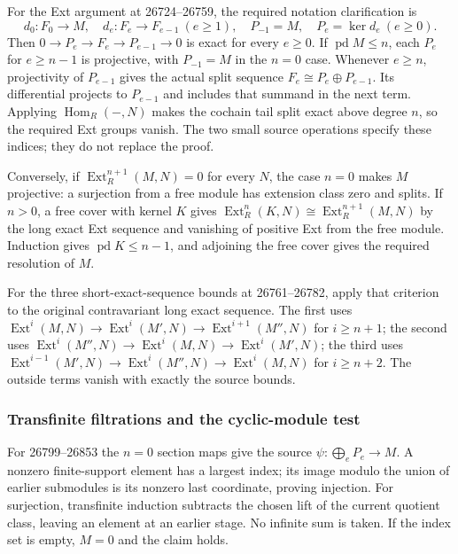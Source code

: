 For the Ext argument at 26724--26759, the required notation clarification is \[
d_0:F_0\to M,\quad d_e:F_e\to F_{e-1}\ (e\ge1),\quad
P_{-1}=M,\quad P_e=\ker d_e\ (e\ge0).
\] Then \(0\to P_e\to F_e\to P_{e-1}\to0\) is exact for every \(e\ge0\). If \(\operatorname{pd}M\le n\), each \(P_e\) for \(e\ge n-1\) is projective, with \(P_{-1}=M\) in the \(n=0\) case. Whenever \(e\ge n\), projectivity of \(P_{e-1}\) gives the actual split sequence \(F_e\cong P_e\oplus P_{e-1}\). Its differential projects to \(P_{e-1}\) and includes that summand in the next term. Applying \(\operatorname{Hom}_R(-,N)\) makes the cochain tail split exact above degree \(n\), so the required Ext groups vanish. The two small source operations specify these indices; they do not replace the proof.

Conversely, if \(\operatorname{Ext}^{n+1}_R(M,N)=0\) for every \(N\), the case \(n=0\) makes \(M\) projective: a surjection from a free module has extension class zero and splits. If \(n>0\), a free cover with kernel \(K\) gives \(\operatorname{Ext}^n_R(K,N)\cong\operatorname{Ext}^{n+1}_R(M,N)\) by the long exact Ext sequence and vanishing of positive Ext from the free module. Induction gives \(\operatorname{pd}K\le n-1\), and adjoining the free cover gives the required resolution of \(M\).

For the three short-exact-sequence bounds at 26761--26782, apply that criterion to the original contravariant long exact sequence. The first uses \(\operatorname{Ext}^i(M,N)\to\operatorname{Ext}^i(M',N)\to\operatorname{Ext}^{i+1}(M'',N)\) for \(i\ge n+1\); the second uses \(\operatorname{Ext}^i(M'',N)\to\operatorname{Ext}^i(M,N)\to\operatorname{Ext}^i(M',N)\); the third uses \(\operatorname{Ext}^{i-1}(M',N)\to\operatorname{Ext}^i(M'',N)\to\operatorname{Ext}^i(M,N)\) for \(i\ge n+2\). The outside terms vanish with exactly the source bounds.

\subsubsection{Transfinite filtrations and the cyclic-module test}\label{transfinite-filtrations-and-the-cyclic-module-test}

For 26799--26853 the \(n=0\) section maps give the source \(\psi:\bigoplus_eP_e\to M\). A nonzero finite-support element has a largest index; its image modulo the union of earlier submodules is its nonzero last coordinate, proving injection. For surjection, transfinite induction subtracts the chosen lift of the current quotient class, leaving an element at an earlier stage. No infinite sum is taken. If the index set is empty, \(M=0\) and the claim holds.

